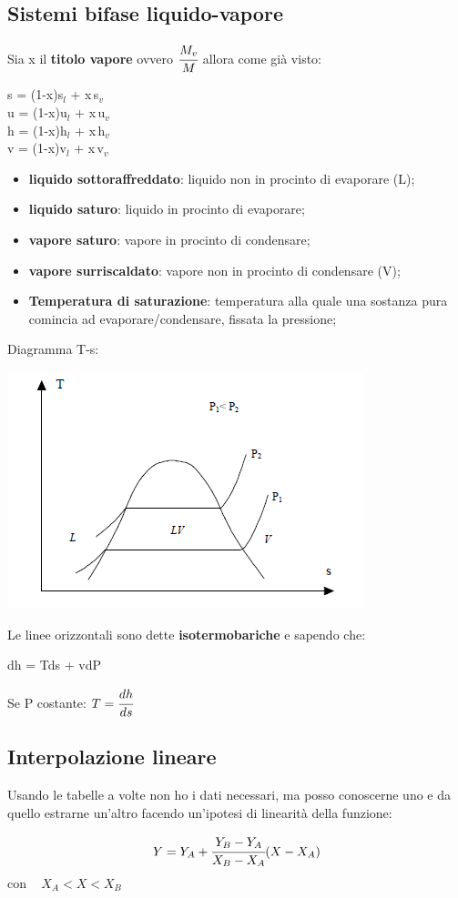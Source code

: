 \documentclass[a4paper,12pt,titlepage]{article}
\begin{document}
\subsection{Sistemi bifase liquido-vapore}
Sia x il \textbf{titolo vapore} ovvero $\cfrac{M_{v}}{M}$ allora come già visto:
\begin{center}
s = (1-x)s$_{l}$ + x$\,$s$_{v}$ \\
u = (1-x)u$_{l}$ + x$\,$u$_{v}$ \\
h = (1-x)h$_{l}$ + x$\,$h$_{v}$ \\
v = (1-x)v$_{l}$ + x$\,$v$_{v}$ \\
\end{center}
\clearpage
\begin{itemize}
\item \textbf{liquido sottoraffreddato}: liquido non in procinto di evaporare (L);
\item \textbf{liquido saturo}: liquido in procinto di evaporare;
\item \textbf{vapore saturo}: vapore in procinto di condensare;
\item \textbf{vapore surriscaldato}: vapore non in procinto di condensare (V);
\item \textbf{Temperatura di saturazione}: temperatura alla quale una sostanza pura comincia ad evaporare/condensare,
fissata la pressione;
\end{itemize}
Diagramma T-s:
\begin{center}
\includegraphics[scale=0.8]{t_s_graph}
\end{center}
Le linee orizzontali sono dette \textbf{isotermobariche} e sapendo che:
\begin{center}
dh = Tds + vdP
\end{center}
Se P costante: $ T = \cfrac{dh}{ds}$

\subsection{Interpolazione lineare}
Usando le tabelle a volte non ho i dati necessari, ma posso conoscerne uno e da quello estrarne un'altro facendo un'ipotesi di linearità della funzione:
\begin{center}
$$ Y = Y_{A} + \cfrac{Y_{B}-Y_{A}}{X_{B}-X_{A}}(X-X_{A})$$ con $\;\;\;X_{A}<X<X_{B}$
\end{center}
\end{document}
